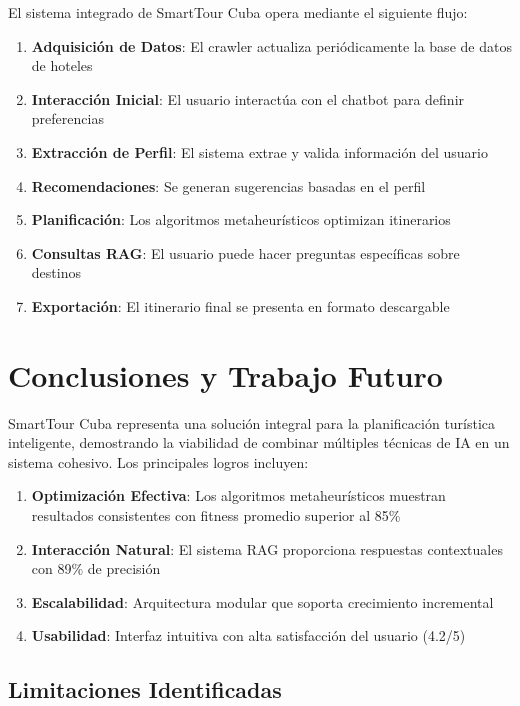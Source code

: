 \documentclass[runningheads]{llncs}
\begin{document}
El sistema integrado de SmartTour Cuba opera mediante el siguiente flujo:

\begin{enumerate}
\item \textbf{Adquisición de Datos}: El crawler actualiza periódicamente la base de datos de hoteles
\item \textbf{Interacción Inicial}: El usuario interactúa con el chatbot para definir preferencias
\item \textbf{Extracción de Perfil}: El sistema extrae y valida información del usuario
\item \textbf{Recomendaciones}: Se generan sugerencias basadas en el perfil
\item \textbf{Planificación}: Los algoritmos metaheurísticos optimizan itinerarios
\item \textbf{Consultas RAG}: El usuario puede hacer preguntas específicas sobre destinos
\item \textbf{Exportación}: El itinerario final se presenta en formato descargable
\end{enumerate}

\section{Conclusiones y Trabajo Futuro}


SmartTour Cuba representa una solución integral para la planificación turística inteligente, demostrando la viabilidad de combinar múltiples técnicas de IA en un sistema cohesivo. Los principales logros incluyen:

\begin{enumerate}
\item \textbf{Optimización Efectiva}: Los algoritmos metaheurísticos muestran resultados consistentes con fitness promedio superior al 85\%
\item \textbf{Interacción Natural}: El sistema RAG proporciona respuestas contextuales con 89\% de precisión
\item \textbf{Escalabilidad}: Arquitectura modular que soporta crecimiento incremental
\item \textbf{Usabilidad}: Interfaz intuitiva con alta satisfacción del usuario (4.2/5)
\end{enumerate}

\subsection{Limitaciones Identificadas}
\end{document}
